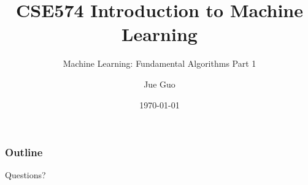 \documentclass[9pt,dvipsnames]{beamer}
\title{CSE574 Introduction to Machine Learning}
\subtitle{Machine Learning: Fundamental Algorithms Part 1}
\author{Jue Guo}
\institute{University at Buffalo}
\date{\today}
\begin{document}
\begin{frame}
    \titlepage
\end{frame}

\begin{frame}
    \frametitle{Outline}
    \tableofcontents
\end{frame}

\begin{frame}
    \begin{center}
        \Huge Questions?
    \end{center}
\end{frame}
\end{document}
